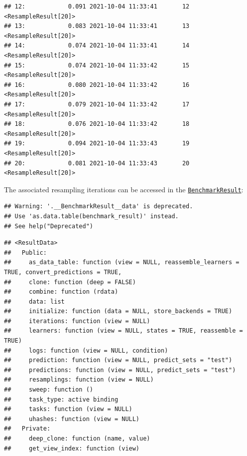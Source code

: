 \documentclass[
]{scrbook}
\newenvironment{Shaded}{\begin{snugshade}}{\end{snugshade}}
\newcommand{\NormalTok}[1]{#1}
\newcommand{\SpecialCharTok}[1]{\textcolor[rgb]{0.00,0.00,0.00}{#1}}
\renewenvironment{Shaded} {\begin{snugshade}\small} {\end{snugshade}}
\begin{document}
\begin{verbatim}
## 12:            0.091 2021-10-04 11:33:41       12 <ResampleResult[20]>
## 13:            0.083 2021-10-04 11:33:41       13 <ResampleResult[20]>
## 14:            0.074 2021-10-04 11:33:41       14 <ResampleResult[20]>
## 15:            0.074 2021-10-04 11:33:42       15 <ResampleResult[20]>
## 16:            0.080 2021-10-04 11:33:42       16 <ResampleResult[20]>
## 17:            0.079 2021-10-04 11:33:42       17 <ResampleResult[20]>
## 18:            0.076 2021-10-04 11:33:42       18 <ResampleResult[20]>
## 19:            0.094 2021-10-04 11:33:43       19 <ResampleResult[20]>
## 20:            0.081 2021-10-04 11:33:43       20 <ResampleResult[20]>
\end{verbatim}

The associated resampling iterations can be accessed in the \href{https://mlr3.mlr-org.com/reference/BenchmarkResult.html}{\texttt{BenchmarkResult}}:

\begin{Shaded}
\end{Shaded}

\begin{verbatim}
## Warning: '.__BenchmarkResult__data' is deprecated.
## Use 'as.data.table(benchmark_result)' instead.
## See help("Deprecated")
\end{verbatim}

\begin{verbatim}
## <ResultData>
##   Public:
##     as_data_table: function (view = NULL, reassemble_learners = TRUE, convert_predictions = TRUE, 
##     clone: function (deep = FALSE) 
##     combine: function (rdata) 
##     data: list
##     initialize: function (data = NULL, store_backends = TRUE) 
##     iterations: function (view = NULL) 
##     learners: function (view = NULL, states = TRUE, reassemble = TRUE) 
##     logs: function (view = NULL, condition) 
##     prediction: function (view = NULL, predict_sets = "test") 
##     predictions: function (view = NULL, predict_sets = "test") 
##     resamplings: function (view = NULL) 
##     sweep: function () 
##     task_type: active binding
##     tasks: function (view = NULL) 
##     uhashes: function (view = NULL) 
##   Private:
##     deep_clone: function (name, value) 
##     get_view_index: function (view)
\end{verbatim}
\end{document}

